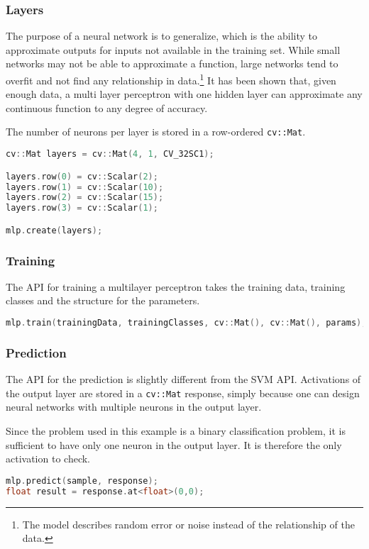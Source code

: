 \subsubsection*{Layers}
The purpose of a neural network is to generalize, which is the ability to approximate outputs for inputs not available in the training set. \cite{Sa02} While small networks may not be able to approximate a function, large networks tend to overfit and not find any relationship in data.\footnote{The model describes random error or noise instead of the relationship of the data.} It has been shown that, given enough data, a multi layer perceptron with one hidden layer can approximate any continuous function to any degree of accuracy.\cite{HSW92}

The number of neurons per layer is stored in a row-ordered \lstinline|cv::Mat|.

\begin{lstlisting}[language=C++]
cv::Mat layers = cv::Mat(4, 1, CV_32SC1);

layers.row(0) = cv::Scalar(2);
layers.row(1) = cv::Scalar(10);
layers.row(2) = cv::Scalar(15);
layers.row(3) = cv::Scalar(1);

mlp.create(layers);
\end{lstlisting}

\subsubsection*{Training}
The API for training a multilayer perceptron takes the training data, training classes and the structure for the parameters.

\begin{lstlisting}[language=C++]
mlp.train(trainingData, trainingClasses, cv::Mat(), cv::Mat(), params);
\end{lstlisting}

\subsubsection*{Prediction}
The API for the prediction is slightly different from the SVM API. Activations of the output layer are stored in a \lstinline|cv::Mat| response, simply because one can design neural networks with multiple neurons in the output layer.

Since the problem used in this example is a binary classification problem, it is sufficient to have only one neuron in the output layer. It is therefore the only activation to check.

\begin{lstlisting}[language=C++]
mlp.predict(sample, response);
float result = response.at<float>(0,0);
\end{lstlisting}